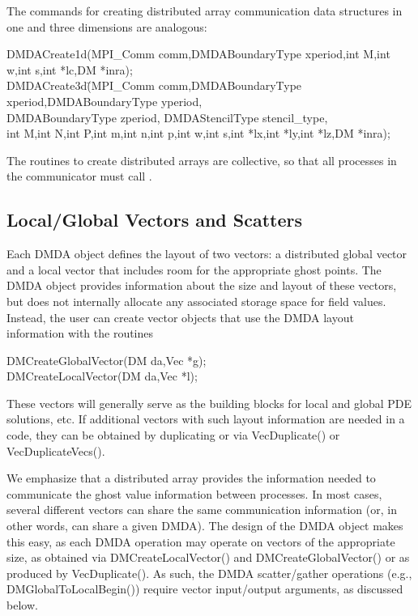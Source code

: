 The commands for creating distributed array communication data structures
in one and three dimensions are analogous:
\begin{tabbing}
  DMDACreate1d(MPI\_Comm comm,DMDABoundaryType xperiod,int M,int w,int s,int *lc,DM *inra);\\
  DMDACreate3d\=(MPI\_Comm comm,DMDABoundaryType xperiod,DMDABoundaryType yperiod, \\
             \> DMDABoundaryType zperiod, DMDAStencilType stencil\_type,\\
             \>int M,int N,int P,int m,int n,int p,int w,int s,int *lx,int *ly,int *lz,DM *inra);
\end{tabbing}
The routines to create distributed arrays are collective, so that all
processes in the communicator  must call .

\subsection{Local/Global Vectors and Scatters}

Each DMDA object defines the layout of two vectors: a distributed
global vector and a local vector that includes room for the
appropriate ghost points.  The DMDA object provides information
about the size and layout of these vectors, but does not internally
allocate any associated storage space for field values.  Instead, the
user can create vector objects that use the DMDA layout
information with the routines
\begin{tabbing}
  DMCreateGlobalVector(DM da,Vec *g);\\
  DMCreateLocalVector(DM da,Vec *l);
\end{tabbing}
These vectors will generally serve as the building blocks for local
and global PDE solutions, etc.  If additional vectors with such
layout information are needed in a code, they can be obtained by
duplicating  or  via
VecDuplicate() or VecDuplicateVecs().

We emphasize that a distributed array provides the information needed
to communicate the ghost value information between processes.  In most
cases, several different vectors can share the same communication
information (or, in other words, can share a given DMDA).  The
design of the DMDA object makes this easy, as each DMDA
operation may operate on vectors of the appropriate size, as obtained
via DMCreateLocalVector() and DMCreateGlobalVector() or as
produced by VecDuplicate().  As such, the DMDA
scatter/gather operations (e.g., DMGlobalToLocalBegin()) require
vector input/output arguments, as discussed below.

